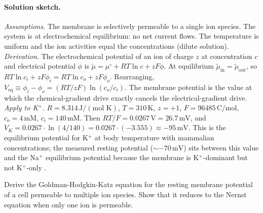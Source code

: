 \paragraph{Solution sketch.}
\emph{Assumptions.} The membrane is selectively permeable to a single
ion species. The system is at electrochemical equilibrium: no net
current flows. The temperature is uniform and the ion activities
equal the concentrations (dilute solution).
\emph{Derivation.} The electrochemical potential of an ion of charge
$z$ at concentration $c$ and electrical potential $\phi$ is
$\tilde\mu = \mu^{\circ} + RT \ln c + zF\phi$. At equilibrium
$\tilde\mu_{\text{in}} = \tilde\mu_{\text{out}}$, so
$RT \ln c_i + zF\phi_i = RT \ln c_o + zF\phi_o$. Rearranging,
$V_{\text{eq}} \equiv \phi_i - \phi_o = (RT/zF)\ln(c_o/c_i)$. The
membrane potential is the value at which the chemical-gradient drive
exactly cancels the electrical-gradient drive.
\emph{Apply to K$^+$.} $R = 8.314\,\text{J}/(\text{mol K})$,
$T = 310\,\text{K}$, $z = +1$, $F = 96485\,\text{C}/\text{mol}$,
$c_o = 4\,\text{mM}$, $c_i = 140\,\text{mM}$. Then
$RT/F = 0.0267\,\text{V} = 26.7\,\text{mV}$, and
$V_K = 0.0267 \cdot \ln(4/140) = 0.0267 \cdot (-3.555)
\approx -95\,\text{mV}$. This is the equilibrium potential for K$^+$
at body temperature with mammalian concentrations; the measured
resting potential ($\sim -70\,\text{mV}$) sits between this value and
the Na$^+$ equilibrium potential because the membrane is K$^+$-dominant
but not K$^+$-only \cite{text:v6c01-hille-channels-2001}.

\begin{exercise}
Derive the Goldman-Hodgkin-Katz equation for the resting membrane
potential of a cell permeable to multiple ion species. Show that it
reduces to the Nernst equation when only one ion is permeable.
\end{exercise}

